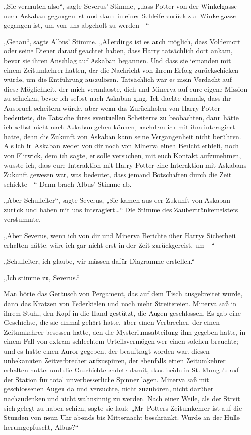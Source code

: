 {„Sie vermuten also“, sagte Severus' Stimme, „dass Potter von der Winkelgasse nach Askaban gegangen ist und dann in einer Schleife zurück zur Winkelgasse gegangen ist, um von uns abgeholt zu werden—“

„Genau“, sagte Albus' Stimme. „Allerdings ist es auch möglich, dass Voldemort oder seine Diener darauf geachtet haben, dass Harry tatsächlich dort ankam, bevor sie ihren Anschlag auf Askaban begannen. Und dass sie jemanden mit einem Zeitumkehrer hatten, der die Nachricht von ihrem Erfolg zurückschicken würde, um die Entführung auszulösen. Tatsächlich war es mein Verdacht auf diese Möglichkeit, der mich veranlasste, dich und Minerva auf eure eigene Mission zu schicken, bevor ich selbst nach Askaban ging. Ich dachte damals, dass ihr Ausbruch scheitern würde, aber wenn das Zurückholen von Harry Potter bedeutete, die Tatsache ihres eventuellen Scheiterns zu beobachten, dann hätte ich selbst nicht nach Askaban gehen können, nachdem ich mit ihm interagiert hatte, denn die Zukunft von Askaban kann seine Vergangenheit nicht berühren. Als ich in Askaban weder von dir noch von Minerva einen Bericht erhielt, noch von Flitwick, dem ich sagte, er solle versuchen, mit euch Kontakt aufzunehmen, wusste ich, dass eure Interaktion mit Harry Potter eine Interaktion mit Askabans Zukunft gewesen war, was bedeutet, dass jemand Botschaften durch die Zeit schickte—“ Dann brach Albus' Stimme ab.

„Aber Schulleiter“, sagte Severus, „Sie kamen aus der Zukunft von Askaban zurück und haben mit uns interagiert…“ Die Stimme des Zaubertränkemeisters verstummte.

„Aber Severus, wenn ich von dir und Minerva Berichte über Harrys Sicherheit erhalten hätte, wäre ich gar nicht erst in der Zeit zurückgereist, um—“

„Schulleiter, ich glaube, wir müssen dafür Diagramme erstellen.“

„Ich stimme zu, Severus.“

Man hörte das Geräusch von Pergament, das auf dem Tisch ausgebreitet wurde, dann das Kratzen von Federkielen und noch mehr Streitereien. Minerva saß in ihrem Stuhl, den Kopf in die Hand gestützt, die Augen geschlossen. Es gab eine Geschichte, die sie einmal gehört hatte, über einen Verbrecher, der einen Zeitumkehrer besessen hatte, den die Mysteriumsabteilung ihm gegeben hatte, in einem Fall von extrem schlechtem Urteilsvermögen wer einen solchen brauchte; und es hatte einen Auror gegeben, der beauftragt worden war, diesen unbekannten Zeitverbrecher aufzuspüren, der ebenfalls einen Zeitumkehrer erhalten hatte; und die Geschichte endete damit, dass beide in St. Mungo's auf der Station für total unverbesserliche Spinner lagen. Minerva saß mit geschlossenen Augen da und versuchte, nicht zuzuhören, nicht darüber nachzudenken und nicht wahnsinnig zu werden. Nach einer Weile, als der Streit sich gelegt zu haben schien, sagte sie laut: „Mr~Potters Zeitumkehrer ist auf die Stunden von neun Uhr abends bis Mitternacht beschränkt. Wurde an der Hülle herumgepfuscht, Albus?“

}
